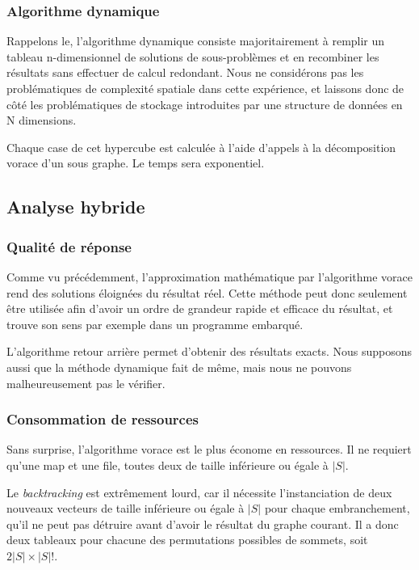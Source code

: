 \documentclass[10pt,a4paper]{article}
\begin{document}
\subsubsection{Algorithme dynamique}

Rappelons le, l'algorithme dynamique consiste majoritairement à remplir un tableau n-dimensionnel de solutions de sous-problèmes et en recombiner les résultats sans effectuer de calcul redondant. Nous ne considérons pas les problématiques de complexité spatiale dans cette expérience, et laissons donc de côté les problématiques de stockage introduites par une structure de données en N dimensions.

Chaque case de cet hypercube est calculée à l'aide d'appels à la décomposition vorace d'un sous graphe. Le temps sera exponentiel.

\subsection{Analyse hybride}

\subsubsection{Qualité de réponse}

Comme vu précédemment, l'approximation mathématique par l'algorithme vorace rend des solutions éloignées du résultat réel. Cette méthode peut donc seulement être utilisée afin d'avoir un ordre de grandeur rapide et efficace du résultat, et trouve son sens par exemple dans un programme embarqué.

L'algorithme retour arrière permet d'obtenir des résultats exacts. Nous supposons aussi que la méthode dynamique fait de même, mais nous ne pouvons malheureusement pas le vérifier.

\subsubsection{Consommation de ressources}

Sans surprise, l'algorithme vorace est le plus économe en ressources. Il ne requiert qu'une map et une file, toutes deux de taille inférieure ou égale à $ |S| $.

Le \textit{backtracking} est extrêmement lourd, car il nécessite l'instanciation de deux nouveaux vecteurs de taille inférieure ou égale à $ |S| $ pour chaque embranchement, qu'il ne peut pas détruire avant d'avoir le résultat du graphe courant. Il a donc deux tableaux pour chacune des permutations possibles de sommets, soit $ 2 |S| \times |S|!$.
\end{document}
